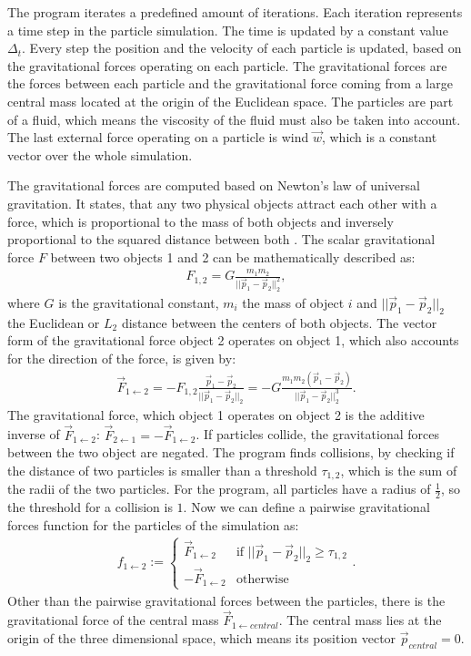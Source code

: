 \documentclass[twoside,11pt]{article}
\begin{document}
The program iterates a predefined amount of iterations.
Each iteration represents a time step in the particle simulation.
The time is updated by a constant value $\Delta_t$.
Every step the position and the velocity of each particle is
updated, based on the gravitational forces operating on each particle.
The gravitational forces are the forces between each particle and the
gravitational force coming from a large central mass located at the
origin of the Euclidean space.
The particles are part of a fluid, which means the viscosity of
the fluid must also be taken into account.
The last external force operating on a particle is wind $\vec{w}$,
which is a constant vector over the whole simulation.

The gravitational forces are computed based on Newton's law of
universal gravitation.
It states, that any two physical objects attract each other
with a force, which is proportional to the mass of both objects and
inversely proportional to the squared distance between both
\citep{feynman1963}.
The scalar gravitational force $F$ between two objects 1 and 2 can be
mathematically described as:
\begin{align}
  F_{1,2} = G\frac{m_1 m_2}{||\vec{p}_1 - \vec{p}_2||_2^2},
\end{align}
where $G$ is the gravitational constant, $m_i$ the mass of object $i$
and $||\vec{p}_1 - \vec{p}_2||_2$ the Euclidean or $L_2$ distance
between the centers of both objects.
The vector form of the gravitational force object 2 operates on object
1, which also accounts for the direction of the force, is given by:
\begin{align}
  \label{eq:F}
  \vec{F}_{1\leftarrow2} = -F_{1,2}\frac{\vec{p}_1 - \vec{p}_2}
                   {||\vec{p}_1 - \vec{p}_2||_2}
          = -G\frac{m_1 m_2 (\vec{p}_1 - \vec{p}_2)}
                   {||\vec{p}_1 - \vec{p}_2||_2^3}.
\end{align}
The gravitational force, which object 1 operates on object 2 is the
additive inverse of $\vec{F}_{1 \leftarrow 2}$:
$\vec{F}_{2 \leftarrow 1} = -\vec{F}_{1 \leftarrow 2}$.
If particles collide, the gravitational forces between the two object
are negated.
The program finds collisions, by checking if the distance of two
particles is smaller than a threshold $\tau_{1,2}$, which is the sum
of the radii of the two particles.
For the program, all particles have a radius of $\frac{1}{2}$, so the
threshold for a collision is $1$.
Now we can define a pairwise gravitational forces function for the
particles of the simulation as:
\begin{align}
  \label{eq:f}
  f_{1 \leftarrow 2} := \begin{cases}
    \vec{F}_{1 \leftarrow 2} &\text{if }
      ||\vec{p}_1 - \vec{p}_2||_2 \ge \tau_{1,2} \\
    -\vec{F}_{1 \leftarrow 2} &\text{otherwise}
  \end{cases}.
\end{align}
Other than the pairwise gravitational forces between the particles,
there is the gravitational force of the central mass
$\vec{F}_{1 \leftarrow central}$.
The central mass lies at the origin of the three dimensional space,
which means its position vector $\vec{p}_{central} = 0$.
\end{document}
